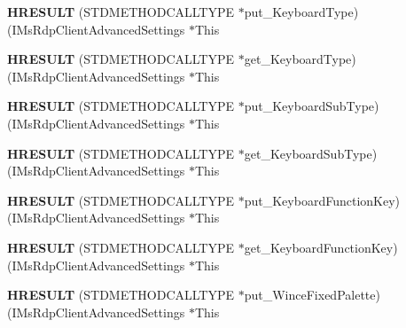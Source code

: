 \begin{DoxyCompactItemize}
{\bfseries H\+R\+E\+S\+U\+LT} (S\+T\+D\+M\+E\+T\+H\+O\+D\+C\+A\+L\+L\+T\+Y\+PE $\ast$put\+\_\+\+Keyboard\+Type)(I\+Ms\+Rdp\+Client\+Advanced\+Settings $\ast$This
\item 
\mbox{\label{struct_i_ms_rdp_client_advanced_settings_vtbl_aa8b0f4683dadc5eaf3466adb1a876933}} 
{\bfseries H\+R\+E\+S\+U\+LT} (S\+T\+D\+M\+E\+T\+H\+O\+D\+C\+A\+L\+L\+T\+Y\+PE $\ast$get\+\_\+\+Keyboard\+Type)(I\+Ms\+Rdp\+Client\+Advanced\+Settings $\ast$This
\item 
\mbox{\label{struct_i_ms_rdp_client_advanced_settings_vtbl_ae523330b671df61abad1b5b4ca7fd1f9}} 
{\bfseries H\+R\+E\+S\+U\+LT} (S\+T\+D\+M\+E\+T\+H\+O\+D\+C\+A\+L\+L\+T\+Y\+PE $\ast$put\+\_\+\+Keyboard\+Sub\+Type)(I\+Ms\+Rdp\+Client\+Advanced\+Settings $\ast$This
\item 
\mbox{\label{struct_i_ms_rdp_client_advanced_settings_vtbl_aa6ed05085dde98575d21f777ca2cca73}} 
{\bfseries H\+R\+E\+S\+U\+LT} (S\+T\+D\+M\+E\+T\+H\+O\+D\+C\+A\+L\+L\+T\+Y\+PE $\ast$get\+\_\+\+Keyboard\+Sub\+Type)(I\+Ms\+Rdp\+Client\+Advanced\+Settings $\ast$This
\item 
\mbox{\label{struct_i_ms_rdp_client_advanced_settings_vtbl_a4644dfcb90ffd3c56261337ca9803ca2}} 
{\bfseries H\+R\+E\+S\+U\+LT} (S\+T\+D\+M\+E\+T\+H\+O\+D\+C\+A\+L\+L\+T\+Y\+PE $\ast$put\+\_\+\+Keyboard\+Function\+Key)(I\+Ms\+Rdp\+Client\+Advanced\+Settings $\ast$This
\item 
\mbox{\label{struct_i_ms_rdp_client_advanced_settings_vtbl_a30602f4b88f43a0ab5ce3c4deb3191d1}} 
{\bfseries H\+R\+E\+S\+U\+LT} (S\+T\+D\+M\+E\+T\+H\+O\+D\+C\+A\+L\+L\+T\+Y\+PE $\ast$get\+\_\+\+Keyboard\+Function\+Key)(I\+Ms\+Rdp\+Client\+Advanced\+Settings $\ast$This
\item 
\mbox{\label{struct_i_ms_rdp_client_advanced_settings_vtbl_a6abe251d42efeae15d11da3b33921d2d}} 
{\bfseries H\+R\+E\+S\+U\+LT} (S\+T\+D\+M\+E\+T\+H\+O\+D\+C\+A\+L\+L\+T\+Y\+PE $\ast$put\+\_\+\+Wince\+Fixed\+Palette)(I\+Ms\+Rdp\+Client\+Advanced\+Settings $\ast$This
\item 

\end{DoxyCompactItemize}
